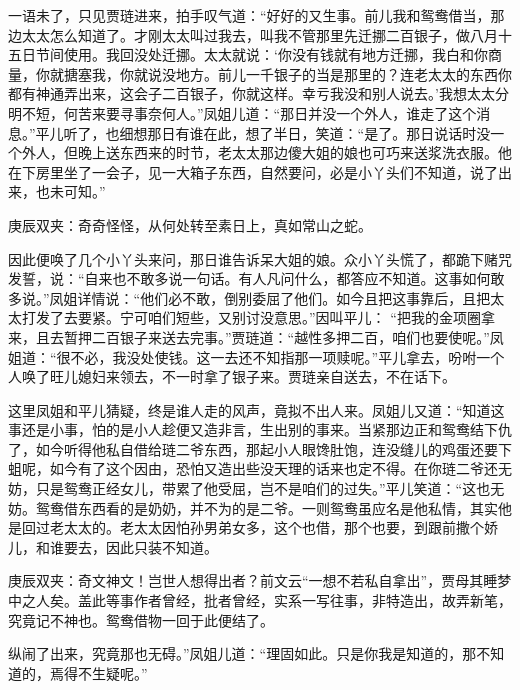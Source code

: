 \begin{parag}
    一语未了，只见贾琏进来，拍手叹气道：“好好的又生事。前儿我和鸳鸯借当，那边太太怎么知道了。才刚太太叫过我去，叫我不管那里先迁挪二百银子，做八月十五日节间使用。我回没处迁挪。太太就说：‘你没有钱就有地方迁挪，我白和你商量，你就搪塞我，你就说没地方。前儿一千银子的当是那里的？连老太太的东西你都有神通弄出来，这会子二百银子，你就这样。幸亏我没和别人说去。’我想太太分明不短，何苦来要寻事奈何人。”凤姐儿道：“那日并没一个外人，谁走了这个消息。”平儿听了，也细想那日有谁在此，想了半日，笑道：“是了。那日说话时没一个外人，但晚上送东西来的时节，老太太那边傻大姐的娘也可巧来送浆洗衣服。他在下房里坐了一会子，见一大箱子东西，自然要问，必是小丫头们不知道，说了出来，也未可知。”\begin{note}庚辰双夹：奇奇怪怪，从何处转至素日上，真如常山之蛇。\end{note}因此便唤了几个小丫头来问，那日谁告诉呆大姐的娘。众小丫头慌了，都跪下赌咒发誓，说：“自来也不敢多说一句话。有人凡问什么，都答应不知道。这事如何敢多说。”凤姐详情说：“他们必不敢，倒别委屈了他们。如今且把这事靠后，且把太太打发了去要紧。宁可咱们短些，又别讨没意思。”因叫平儿： “把我的金项圈拿来，且去暂押二百银子来送去完事。”贾琏道：“越性多押二百，咱们也要使呢。”凤姐道：“很不必，我没处使钱。这一去还不知指那一项赎呢。”平儿拿去，吩咐一个人唤了旺儿媳妇来领去，不一时拿了银子来。贾琏亲自送去，不在话下。
\end{parag}


\begin{parag}
    这里凤姐和平儿猜疑，终是谁人走的风声，竟拟不出人来。凤姐儿又道：“知道这事还是小事，怕的是小人趁便又造非言，生出别的事来。当紧那边正和鸳鸯结下仇了，如今听得他私自借给琏二爷东西，那起小人眼馋肚饱，连没缝儿的鸡蛋还要下蛆呢，如今有了这个因由，恐怕又造出些没天理的话来也定不得。在你琏二爷还无妨，只是鸳鸯正经女儿，带累了他受屈，岂不是咱们的过失。”平儿笑道：“这也无妨。鸳鸯借东西看的是奶奶，并不为的是二爷。一则鸳鸯虽应名是他私情，其实他是回过老太太的。老太太因怕孙男弟女多，这个也借，那个也要，到跟前撒个娇儿，和谁要去，因此只装不知道。\begin{note}庚辰双夹：奇文神文！岂世人想得出者？前文云“一想不若私自拿出”，贾母其睡梦中之人矣。盖此等事作者曾经，批者曾经，实系一写往事，非特造出，故弄新笔，究竟记不神也。鸳鸯借物一回于此便结了。\end{note}纵闹了出来，究竟那也无碍。”凤姐儿道：“理固如此。只是你我是知道的，那不知道的，焉得不生疑呢。”
\end{parag}


